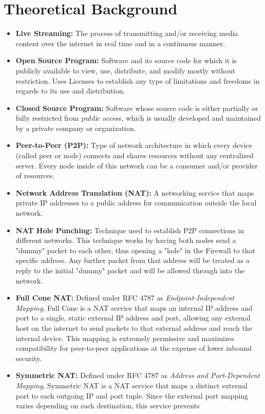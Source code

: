 \documentclass{article}
\begin{document}
\section{Theoretical Background}
\begin{itemize}
    \item \textbf{Live Streaming:} The process of transmitting and/or receiving media content over the internet in real time and in a continuous manner.
    \item \textbf{Open Source Program:} Software and its source code for which it is publicly available to view, use, distribute, and modify mostly without restriction. Uses Licenses to establish any type of limitations and freedoms in regards to its use and distribution.
    \item \textbf{Closed Source Program:} Software whose source code is either partially or fully restricted from public access, which is usually developed and maintained by a private company or organization.
    \item \textbf{Peer-to-Peer (P2P):} Type of network architecture in which every device (called peer or node) connects and shares resources without any centralized server. Every node inside of this network can be a consumer and/or provider of resources.
    \item \textbf{Network Address Translation (NAT):} A networking service that maps private IP addresses to a public address for communication outside the local network.
    \item \textbf{NAT Hole Punching:} Technique used to establish P2P connections in different networks. This technique works by having both nodes send a "dummy" packet to each other, thus opening a "hole" in the Firewall to that specific address. Any further packet from that address will be treated as a reply to the initial "dummy" packet and will be allowed through into the network.
    \item \textbf{Full Cone NAT:} Defined under RFC 4787 as \textit{Endpoint-Independent Mapping}, Full Cone is a NAT service that maps an internal IP address and port to a single, static external IP address and port, allowing any external host on the internet to send packets to that external address and reach the internal device. This mapping is extremely permissive and maximizes compatibility for peer-to-peer applications at the expense of lower inbound security.
    \item \textbf{Symmetric NAT:} Defined under RFC 4787 as \textit{Address and Port-Dependent Mapping}, Symmetric NAT is a NAT service that maps a distinct external port to each outgoing IP and port tuple. Since the external port mapping varies depending on each destination, this service prevents 

\end{itemize}
\end{document}
